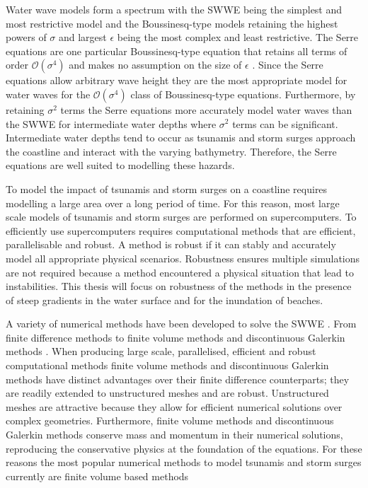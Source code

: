 Water wave models form a spectrum with the SWWE being the simplest and most restrictive model and the Boussinesq-type models retaining the highest powers of $\sigma$ and largest $\epsilon$ being the most complex and least restrictive. The Serre equations are one particular Boussinesq-type equation that retains all terms of order $\mathcal{O}\left(\sigma ^4\right)$ and makes no assumption on the size of $\epsilon$ \cite{Bonneton-Lannes-2009-16601}. Since the Serre equations allow arbitrary wave height they are the most appropriate model for water waves for the $\mathcal{O}\left(\sigma ^4\right)$ class of Boussinesq-type equations. Furthermore, by retaining $\sigma^2$ terms the Serre equations more accurately model water waves than the SWWE for intermediate water depths where $\sigma^2$ terms can be significant. Intermediate water depths tend to occur as tsunamis and storm surges approach the coastline and interact with the varying bathymetry. Therefore, the Serre equations are well suited to modelling these hazards. 

To model the impact of tsunamis and storm surges on a coastline requires modelling a large area over a long period of time. For this reason, most large scale models of tsunamis and storm surges are performed on supercomputers. To efficiently use supercomputers requires computational methods that are efficient, parallelisable and robust. A method is robust if it can stably and accurately model all appropriate physical scenarios. Robustness ensures multiple simulations are not required because a method encountered a physical situation that lead to instabilities. This thesis will focus on robustness of the methods in the presence of steep gradients in the water surface and for the inundation of beaches.  

A variety of numerical methods have been developed to solve the SWWE \cite{ClawPack,Comcot,ANUGA,Eskilsson}. From finite difference methods \cite{Comcot} to finite volume methods \cite{ClawPack,ANUGA} and discontinuous Galerkin methods \cite{Eskilsson}. When producing large scale, parallelised, efficient and robust computational methods finite volume methods and discontinuous Galerkin methods have distinct advantages over their finite difference counterparts; they are readily extended to unstructured meshes and are robust. Unstructured meshes are attractive because they allow for efficient numerical solutions over complex geometries. Furthermore, finite volume methods and discontinuous Galerkin methods conserve mass and momentum in their numerical solutions, reproducing the conservative physics at the foundation of the equations. For these reasons the most popular numerical methods to model tsunamis and storm surges currently are finite volume based methods \cite{ClawPack,ANUGA}

